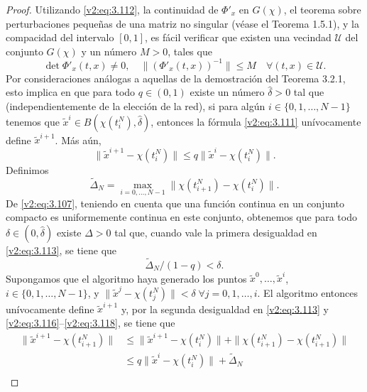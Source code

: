 \begin{proof}
    Utilizando \eqref{v2:eq:3.112}, la continuidad de $\Phi'_x$ en $G(\chi)$, el teorema sobre perturbaciones pequeñas de una matriz no singular (véase el Teorema 1.5.1), y la compacidad del intervalo $[0, 1]$, es fácil verificar que existen una vecindad $\mathcal{U}$ del conjunto $G(\chi)$ y un número $M > 0$, tales que
    \begin{equation}
        \det \Phi'_x(t, x) \neq 0, \quad \|(\Phi'_x(t, x))^{-1}\| \le M \quad \forall (t, x) \in \mathcal{U}.
        \label{v2:eq:3.115}
    \end{equation}
    Por consideraciones análogas a aquellas de la demostración del Teorema 3.2.1, esto implica en que para todo $q \in (0, 1)$ existe un número $\hat{\delta} > 0$ tal que (independientemente de la elección de la red), si para algún $i \in \{0, 1, \dots, N-1\}$ tenemos que $\tilde{x}^i \in B(\chi(t_i^N), \hat{\delta})$, entonces la fórmula \eqref{v2:eq:3.111} unívocamente define $\tilde{x}^{i+1}$. Más aún,
    \begin{equation}
        \|\tilde{x}^{i+1} - \chi(t_i^N)\| \le q\|\tilde{x}^i - \chi(t_i^N)\|.
        \label{v2:eq:3.116}
    \end{equation}
    Definimos
    \begin{equation}
        \tilde{\Delta}_N = \max_{i=0, \dots, N-1} \|\chi(t_{i+1}^N) - \chi(t_i^N)\|.
        \label{v2:eq:3.117}
    \end{equation}
    De \eqref{v2:eq:3.107}, teniendo en cuenta que una función continua en un conjunto compacto es uniformemente continua en este conjunto, obtenemos que para todo $\delta \in (0, \hat{\delta})$ existe $\Delta > 0$ tal que, cuando vale la primera desigualdad en \eqref{v2:eq:3.113}, se tiene que
    \begin{equation}
        \tilde{\Delta}_N / (1 - q) < \delta.
        \label{v2:eq:3.118}
    \end{equation}
    Supongamos que el algoritmo haya generado los puntos $\tilde{x}^0, \dots, \tilde{x}^i$, $i \in \{0, 1, \dots, N-1\}$, y $\|\tilde{x}^j - \chi(t_j^N)\| < \delta \; \forall j = 0, 1, \dots, i$. El algoritmo entonces unívocamente define $\tilde{x}^{i+1}$ y, por la segunda desigualdad en \eqref{v2:eq:3.113} y \eqref{v2:eq:3.116}--\eqref{v2:eq:3.118}, se tiene que
    \begin{align*}
        \|\tilde{x}^{i+1} - \chi(t_{i+1}^N)\| &\le \|\tilde{x}^{i+1} - \chi(t_i^N)\| + \|\chi(t_{i+1}^N) - \chi(t_{i+1}^N)\| \\
        &\le q\|\tilde{x}^i - \chi(t_i^N)\| + \tilde{\Delta}_N \\

\end{align*}
\end{proof}
